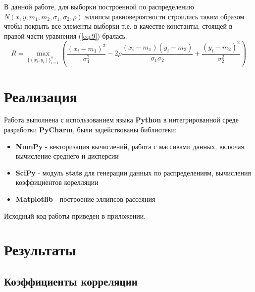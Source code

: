 \documentclass[12pt,a4paper]{article}
\begin{document}
В данной работе, для выборки построенной по распределению $N(x, y, m_1, m_2, \sigma_1, \sigma_2, \rho)$ эллипсы равновероятности строились таким образом чтобы покрыть все элементы выборки т.е. в качестве константы, стоящей в правой части уравнения (\ref{eq:9}) бралась:
\begin{equation}
	R = \max_{\{(x_i, y_i)\}_{i=1}^n}{\left(\frac{(x_i - m_1)^2}{\sigma_1^2} - 2\rho\frac{(x_i - m_1)(y_i - m_2)}{\sigma_1\sigma_2} + \frac{(y_i - m_2)^2}{\sigma_2^2}\right)}
\end{equation}
\pagebreak

\section{Реализация}
\label{sec:impl}
Работа выполнена с использованием языка \textbf{Python} в интегрированной среде разработки \textbf{PyCharm}, были задействованы библиотеки:

\begin{itemize}
	\item \textbf{NumPy} - векторизация вычислений, работа с массивами данных, включая вычисление среднего и дисперсии
	\item \textbf{SciPy} - модуль \textbf{stats} для генерации данных по распределениям, вычисления коэффициентов корелляции
	\item \textbf{Matplotlib} - построение эллипсов рассеяния
\end{itemize}

Исходный код работы приведен в приложении. 
\pagebreak

\section{Результаты}
\subsection{Коэффициенты корреляции}
\begin{table}[h!]
	\centering
	
	\caption{$\rho = 0$}
\end{table}
\begin{table}[h!]
	\centering
	
	\caption{$\rho = 0.5$}
\end{table}
\pagebreak

\begin{table}[h!]
	\centering
	
	\caption{$\rho = 0.9$}
\end{table}
\end{document}
